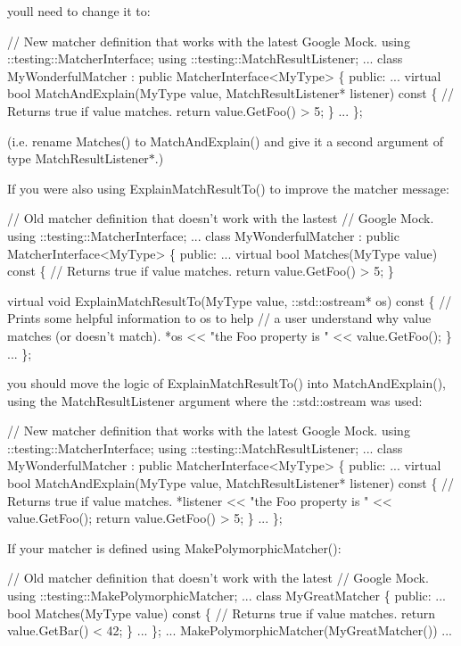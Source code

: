 you\textquotesingle{}ll need to change it to\+: 
\begin{DoxyCode}
// New matcher definition that works with the latest Google Mock.
using ::testing::MatcherInterface;
using ::testing::MatchResultListener;
...
class MyWonderfulMatcher : public MatcherInterface<MyType> \{
 public:
  ...
  virtual bool MatchAndExplain(MyType value,
                               MatchResultListener* listener) const \{
    // Returns true if value matches.
    return value.GetFoo() > 5;
  \}
  ...
\};
\end{DoxyCode}
 (i.\+e. rename {\ttfamily Matches()} to {\ttfamily Match\+And\+Explain()} and give it a second argument of type {\ttfamily Match\+Result\+Listener$\ast$}.)

If you were also using {\ttfamily Explain\+Match\+Result\+To()} to improve the matcher message\+: 
\begin{DoxyCode}
// Old matcher definition that doesn't work with the lastest
// Google Mock.
using ::testing::MatcherInterface;
...
class MyWonderfulMatcher : public MatcherInterface<MyType> \{
 public:
  ...
  virtual bool Matches(MyType value) const \{
    // Returns true if value matches.
    return value.GetFoo() > 5;
  \}

  virtual void ExplainMatchResultTo(MyType value,
                                    ::std::ostream* os) const \{
    // Prints some helpful information to os to help
    // a user understand why value matches (or doesn't match).
    *os << "the Foo property is " << value.GetFoo();
  \}
  ...
\};
\end{DoxyCode}


you should move the logic of {\ttfamily Explain\+Match\+Result\+To()} into {\ttfamily Match\+And\+Explain()}, using the {\ttfamily Match\+Result\+Listener} argument where the {\ttfamily \+::std\+::ostream} was used\+: 
\begin{DoxyCode}
// New matcher definition that works with the latest Google Mock.
using ::testing::MatcherInterface;
using ::testing::MatchResultListener;
...
class MyWonderfulMatcher : public MatcherInterface<MyType> \{
 public:
  ...
  virtual bool MatchAndExplain(MyType value,
                               MatchResultListener* listener) const \{
    // Returns true if value matches.
    *listener << "the Foo property is " << value.GetFoo();
    return value.GetFoo() > 5;
  \}
  ...
\};
\end{DoxyCode}


If your matcher is defined using {\ttfamily Make\+Polymorphic\+Matcher()}\+: 
\begin{DoxyCode}
// Old matcher definition that doesn't work with the latest
// Google Mock.
using ::testing::MakePolymorphicMatcher;
...
class MyGreatMatcher \{
 public:
  ...
  bool Matches(MyType value) const \{
    // Returns true if value matches.
    return value.GetBar() < 42;
  \}
  ...
\};
... MakePolymorphicMatcher(MyGreatMatcher()) ...
\end{DoxyCode}


